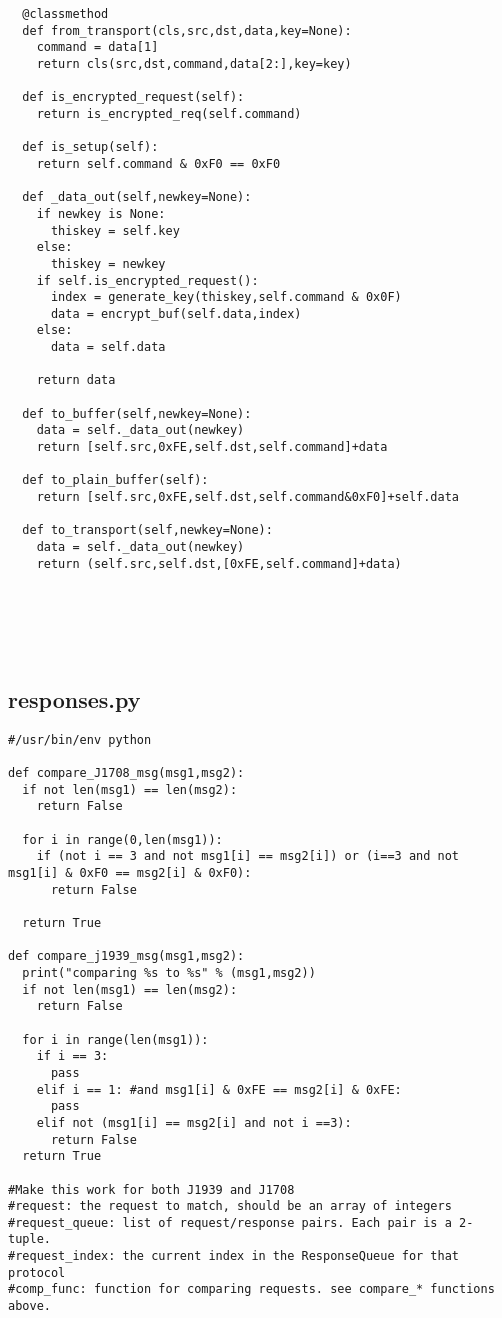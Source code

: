 \begin{appendices}
\begin{verbatim}
  @classmethod
  def from_transport(cls,src,dst,data,key=None):
    command = data[1]
    return cls(src,dst,command,data[2:],key=key)

  def is_encrypted_request(self):
    return is_encrypted_req(self.command)

  def is_setup(self):
    return self.command & 0xF0 == 0xF0

  def _data_out(self,newkey=None):
    if newkey is None:
      thiskey = self.key
    else:
      thiskey = newkey
    if self.is_encrypted_request():
      index = generate_key(thiskey,self.command & 0x0F)
      data = encrypt_buf(self.data,index)
    else:
      data = self.data

    return data

  def to_buffer(self,newkey=None):
    data = self._data_out(newkey)
    return [self.src,0xFE,self.dst,self.command]+data

  def to_plain_buffer(self):
    return [self.src,0xFE,self.dst,self.command&0xF0]+self.data

  def to_transport(self,newkey=None):
    data = self._data_out(newkey)
    return (self.src,self.dst,[0xFE,self.command]+data)






\end{verbatim}


\subsection{responses.py}
\begin{verbatim}
#/usr/bin/env python

def compare_J1708_msg(msg1,msg2):
  if not len(msg1) == len(msg2):
    return False
  
  for i in range(0,len(msg1)):
    if (not i == 3 and not msg1[i] == msg2[i]) or (i==3 and not msg1[i] & 0xF0 == msg2[i] & 0xF0):
      return False
  
  return True

def compare_j1939_msg(msg1,msg2):
  print("comparing %s to %s" % (msg1,msg2))
  if not len(msg1) == len(msg2):
    return False

  for i in range(len(msg1)):
    if i == 3:
      pass
    elif i == 1: #and msg1[i] & 0xFE == msg2[i] & 0xFE:
      pass
    elif not (msg1[i] == msg2[i] and not i ==3):
      return False
  return True

#Make this work for both J1939 and J1708
#request: the request to match, should be an array of integers
#request_queue: list of request/response pairs. Each pair is a 2-tuple.
#request_index: the current index in the ResponseQueue for that protocol
#comp_func: function for comparing requests. see compare_* functions above.


\end{verbatim}
\end{appendices}
